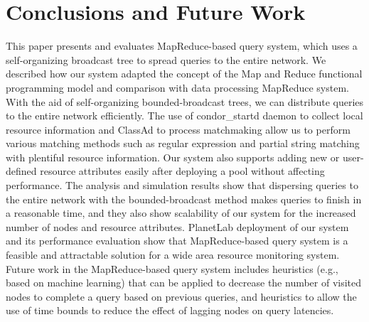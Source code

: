 \documentclass{acm_proc_article-sp}
\begin{document}
\section{Conclusions and Future Work}
This paper presents and evaluates MapReduce-based query system, which uses a self-organizing broadcast tree to spread queries to the entire network.
We described how our system adapted the concept of the Map and Reduce functional programming model and comparison with data processing MapReduce system.
With the aid of self-organizing bounded-broadcast trees, we can distribute queries to the entire network efficiently. 
The use of condor\_startd daemon to collect local resource information and ClassAd to process matchmaking allow us to perform various matching methods such as regular expression and  partial string matching with plentiful resource information.
Our system also supports adding new or user-defined resource attributes easily after deploying a pool without affecting performance.
The analysis and simulation results show that dispersing queries to the entire network with the bounded-broadcast method makes queries to finish in a reasonable time, 
and they also show scalability of our system for the increased number of nodes and resource attributes.
PlanetLab deployment of our system and its performance evaluation show that MapReduce-based query system is a feasible and attractable solution for a wide area resource monitoring system.
Future work in the MapReduce-based query system includes heuristics (e.g., based on machine learning) that can be applied to decrease the number of visited nodes to complete a query based on previous queries, and heuristics to allow the use of time bounds to reduce the effect of lagging nodes on query latencies.




\balancecolumns
\end{document}
